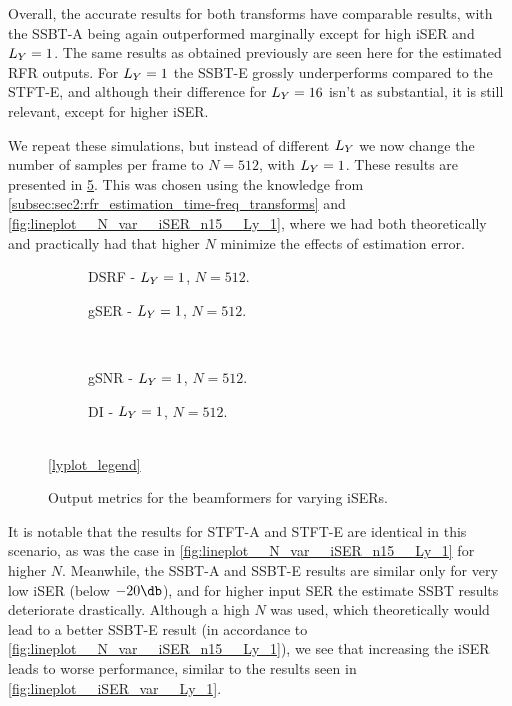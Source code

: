 Overall, the accurate results for both transforms have comparable results, with the SSBT-A being again outperformed marginally except for high iSER and $\Ly = 1$. The same results as obtained previously are seen here for the estimated RFR outputs. For $\Ly = 1$ the SSBT-E grossly underperforms compared to the STFT-E, and although their difference for $\Ly = 16$ isn't as substantial, it is still relevant, except for higher iSER.

We repeat these simulations, but instead of different $\Ly$ we now change the number of samples per frame to $N = 512$, with $\Ly = 1$. These results are presented in \cref{fig:lineplot__N_512__iSER_var__Ly_1}. This was chosen using the knowledge from \cref{subsec:sec2:rfr_estimation_time-freq_transforms} and \cref{fig:lineplot__N_var__iSER_n15__Ly_1}, where we had both theoretically and practically had that higher $N$ minimize the effects of estimation error.

\begin{figure}[!ht]
	\centering
	\begin{subfigure}{0.49\textwidth}
		\centering
		
		\caption{DSRF - $\Ly = 1$, $N = 512$.}
		\label{subfig:lineplot__DSRF__N_512__iSER_var__Ly_1}
	\end{subfigure}\hfill
	\begin{subfigure}{0.49\textwidth}
		\centering
		
		\caption{gSER - $\Ly = 1$, $N = 512$.}
		\label{subfig:lineplot__gSER__N_512__iSER_var__Ly_1}
	\end{subfigure}\\[1em]
	\begin{subfigure}{0.49\textwidth}
		\centering
		
		\caption{gSNR - $\Ly = 1$, $N = 512$.}
		\label{subfig:lineplot__gSNR__N_512__iSER_var__Ly_1}
	\end{subfigure}\hfill
	\begin{subfigure}{0.49\textwidth}
		\centering
		
		\caption{DI - $\Ly = 1$, $N = 512$.}
		\label{subfig:lineplot__DI__N_512__iSER_var__Ly_1}
	\end{subfigure}\\[1em]
	\ref*{lyplot_legend}
	\caption{Output metrics for the beamformers for varying iSERs.}
	\label{fig:lineplot__N_512__iSER_var__Ly_1}
\end{figure}

It is notable that the results for STFT-A and STFT-E are identical in this scenario, as was the case in \cref{fig:lineplot__N_var__iSER_n15__Ly_1} for higher $N$. Meanwhile, the SSBT-A and SSBT-E results are similar only for very low iSER (below $-20\dB$), and for higher input SER the estimate SSBT results deteriorate drastically. Although a high $N$ was used, which theoretically would lead to a better SSBT-E result (in accordance to \cref{fig:lineplot__N_var__iSER_n15__Ly_1}), we see that increasing the iSER leads to worse performance, similar to the results seen in \cref{fig:lineplot__iSER_var__Ly_1}.

